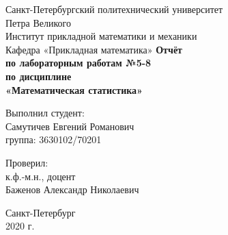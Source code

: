 \documentclass[12pt,a4paper]{article}
\begin{document}
	
\begin{titlepage}
	\begin{center}		
		\vfill	
		Санкт-Петербургский политехнический университет \\
		Петра Великого\\
		\vskip 1cm
		Институт прикладной математики и механики \\
		Кафедра «Прикладная математика»
		\vfill
		\textbf{Отчёт\\
			по лабораторным работам №5-8\\
			по дисциплине\\
			«Математическая статистика»\\}
		\vfill
	\end{center}
	\vfill
	\hfill
	\begin{minipage}{0.4\textwidth}
		Выполнил студент:\\
		Самутичев Евгений Романович\\
		группа: 3630102/70201\\
	\end{minipage}
	\vfill
	\hfill 
	\begin{minipage}{0.4\textwidth}
		Проверил:\\
		к.ф.-м.н., доцент\\
		Баженов Александр Николаевич\
	\end{minipage}
	\vfill
	\begin{center}
		Санкт-Петербург\\2020 г.
	\end{center}
\end{titlepage}

\tableofcontents
\listoffigures
\listoftables
\pagebreak
\end{document}
